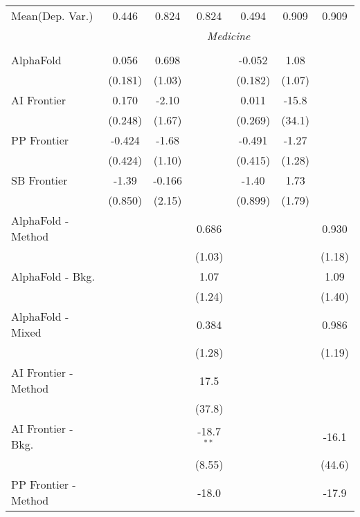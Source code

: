 \begin{tabular}{lcccccc}
Mean(Dep. Var.) & 0.446 & 0.824 & 0.824 & 0.494 & 0.909 & 0.909 \\
 & \multicolumn{6}{c}{\textit{Medicine}} \\ \\
   AlphaFold            & 0.056   & 0.698  &              & -0.052  & 1.08   &   \\   
                        & (0.181) & (1.03) &              & (0.182) & (1.07) &   \\   
   AI Frontier          & 0.170   & -2.10  &              & 0.011   & -15.8  &   \\   
                        & (0.248) & (1.67) &              & (0.269) & (34.1) &   \\   
   PP Frontier          & -0.424  & -1.68  &              & -0.491  & -1.27  &   \\   
                        & (0.424) & (1.10) &              & (0.415) & (1.28) &   \\   
   SB Frontier          & -1.39   & -0.166 &              & -1.40   & 1.73   &   \\   
                        & (0.850) & (2.15) &              & (0.899) & (1.79) &   \\   
   AlphaFold - Method   &         &        & 0.686        &         &        & 0.930\\   
                        &         &        & (1.03)       &         &        & (1.18)\\   
   AlphaFold - Bkg.     &         &        & 1.07         &         &        & 1.09\\   
                        &         &        & (1.24)       &         &        & (1.40)\\   
   AlphaFold - Mixed    &         &        & 0.384        &         &        & 0.986\\   
                        &         &        & (1.28)       &         &        & (1.19)\\   
   AI Frontier - Method &         &        & 17.5         &         &        &   \\   
                        &         &        & (37.8)       &         &        &   \\   
   AI Frontier - Bkg.   &         &        & -18.7$^{**}$ &         &        & -16.1\\   
                        &         &        & (8.55)       &         &        & (44.6)\\   
   PP Frontier - Method &         &        & -18.0        &         &        & -17.9\\   

\end{tabular}
